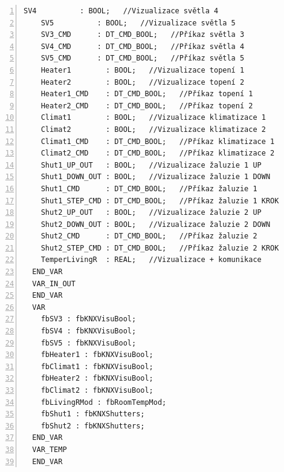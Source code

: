 \begin{lstlisting}[language=ST, breaklines=true, numbers=left, numberstyle=\small, numbersep=10pt, frame=single, basicstyle=\ttfamily\small, caption={Definice funkčního bloku fbLivRoom}, label={lst:fbLivRoom}]
    SV4          : BOOL;   //Vizualizace světla 4
    SV5          : BOOL;   //Vizualizace světla 5
    SV3_CMD      : DT_CMD_BOOL;   //Příkaz světla 3
    SV4_CMD      : DT_CMD_BOOL;   //Příkaz světla 4
    SV5_CMD      : DT_CMD_BOOL;   //Příkaz světla 5
    Heater1        : BOOL;   //Vizualizace topení 1
    Heater2        : BOOL;   //Vizualizace topení 2
    Heater1_CMD    : DT_CMD_BOOL;   //Příkaz topení 1
    Heater2_CMD    : DT_CMD_BOOL;   //Příkaz topení 2
    Climat1        : BOOL;   //Vizualizace klimatizace 1
    Climat2        : BOOL;   //Vizualizace klimatizace 2
    Climat1_CMD    : DT_CMD_BOOL;   //Příkaz klimatizace 1
    Climat2_CMD    : DT_CMD_BOOL;   //Příkaz klimatizace 2
    Shut1_UP_OUT   : BOOL;   //Vizualizace žaluzie 1 UP
    Shut1_DOWN_OUT : BOOL;   //Vizualizace žaluzie 1 DOWN
    Shut1_CMD      : DT_CMD_BOOL;   //Příkaz žaluzie 1
    Shut1_STEP_CMD : DT_CMD_BOOL;   //Příkaz žaluzie 1 KROK
    Shut2_UP_OUT   : BOOL;   //Vizualizace žaluzie 2 UP
    Shut2_DOWN_OUT : BOOL;   //Vizualizace žaluzie 2 DOWN
    Shut2_CMD      : DT_CMD_BOOL;   //Příkaz žaluzie 2
    Shut2_STEP_CMD : DT_CMD_BOOL;   //Příkaz žaluzie 2 KROK
    TemperLivingR  : REAL;   //Vizualizace + komunikace
  END_VAR
  VAR_IN_OUT
  END_VAR
  VAR
    fbSV3 : fbKNXVisuBool;
    fbSV4 : fbKNXVisuBool;
    fbSV5 : fbKNXVisuBool;
    fbHeater1 : fbKNXVisuBool;
    fbClimat1 : fbKNXVisuBool;
    fbHeater2 : fbKNXVisuBool;
    fbClimat2 : fbKNXVisuBool;
    fbLivingRMod : fbRoomTempMod;
    fbShut1 : fbKNXShutters;
    fbShut2 : fbKNXShutters;
  END_VAR
  VAR_TEMP
  END_VAR
\end{lstlisting}
